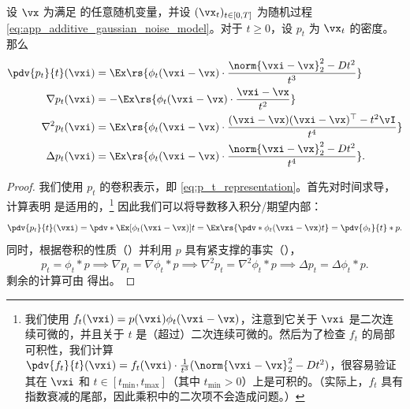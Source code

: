 \documentclass[../../book-main_zh.tex]{subfiles}
\begin{document}
\begin{proposition}\label{prop:p_t_derivatives}
    设 \(\vx\) 为满足  的任意随机变量，并设 \((\vx_{t})_{t \in [0, T]}\) 为随机过程 \eqref{eq:app_additive_gaussian_noise_model}。对于 \(t \geq 0\)，设 \(p_{t}\) 为 \(\vx_{t}\) 的密度。那么
    \begin{align}
        \pdv{p_{t}}{t}(\vxi)
        &= \Ex\rs{\phi_{t}(\vxi - \vx)\cdot\frac{\norm{\vxi -
        \vx}_{2}^{2} - Dt^{2}}{t^{3}}} \\
        \nabla p_{t}(\vxi)
        &= -\Ex\rs{\phi_{t}(\vxi - \vx)\cdot\frac{\vxi - \vx}{t^{2}}} \\
        \nabla^{2}p_{t}(\vxi)
        &= \Ex\rs{\phi_{t}(\vxi - \vx)\cdot\frac{(\vxi - \vx)(\vxi -
        \vx)^{\top} - t^{2}\vI}{t^{4}}} \\
        \Delta p_{t}(\vxi)
        &= \Ex\rs{\phi_{t}(\vxi - \vx)\cdot\frac{\norm{\vxi -
        \vx}_{2}^{2} - Dt^{2}}{t^{4}}}.
    \end{align}
\end{proposition}
\begin{proof}
    我们使用 \(p_{t}\) 的卷积表示，即 \eqref{eq:p_t_representation}。首先对时间求导，计算表明  是适用的，\footnote{我们使用 \(f_{t}(\vxi) = p(\vxi) \phi_{t}(\vxi - \vx)\)，注意到它关于 \(\vxi\) 是二次连续可微的，并且关于 \(t\) 是（超过）二次连续可微的。然后为了检查 \(f_{t}\) 的局部可积性，我们计算 \(\pdv{f_{t}}{t}(\vxi) = f_{t}(\vxi)\cdot \frac{1}{t^{3}}(\norm{\vxi - \vx}_{2}^{2} - Dt^{2})\)，很容易验证其在 \(\vxi\) 和 \(t \in [t_{\min}, t_{\max}]\)（其中 \(t_{\min} > 0\)）上是可积的。（实际上，\(f_{t}\) 具有指数衰减的尾部，因此乘积中的二次项不会造成问题。）} 因此我们可以将导数移入积分/期望内部：
    \begin{equation}
        \pdv{p_{t}}{t}(\vxi) = \pdv*{\Ex[\phi_{t}(\vxi - \vx)]}{t} =
        \Ex\rs{\pdv*{\phi_{t}(\vxi - \vx)}{t}} = \pdv{\phi_{t}}{t} * p.
    \end{equation}
    同时，根据卷积的性质（）并利用 \(p\) 具有紧支撑的事实（），
    \begin{equation}
        p_{t} = \phi_{t} * p \implies \nabla p_{t} = \nabla \phi_{t}
        * p \implies \nabla^{2}p_{t} = \nabla^{2}\phi_{t} * p
        \implies \Delta p_{t} = \Delta \phi_{t} * p.
    \end{equation}
    剩余的计算可由  得出。
\end{proof}
\end{document}

